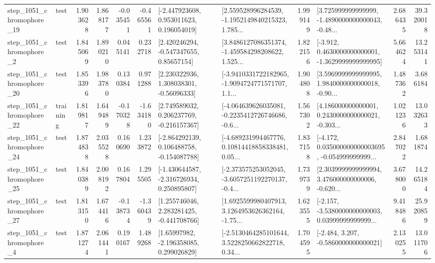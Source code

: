 \begin{tabular}{llrrrrllrlrr}
 step\_1051\_chromophore\_19 &      test &      1.903628 &    1.868177 &     -0.035451 & -0.465561 &    [-2.447923608, 0.953011623, 0.196054019] &  [2.559528996284539, -1.1952149840215323, 1.785... &       1.999149 &  [3.725999999999999, -1.4890000000000043, -0.48... &            2.686435 &         39.320018 \\
  step\_1051\_chromophore\_2 &      test &      1.845069 &    1.890210 &      0.045141 &  0.232718 &     [2.420246294, -0.547347655, 0.85657154] &  [3.8486127086351374, -1.459584298208622, 1.525... &       1.822156 &  [-3.912, 0.4630000000000001, -1.3629999999999995] &            5.664624 &         13.253141 \\
 step\_1051\_chromophore\_20 &      test &      1.853396 &    1.983780 &      0.130384 &  0.971288 &     [2.230322936, 1.308038301, -0.56096333] &  [-3.9410331722182965, -1.9094724771571707, 1.1... &       1.904808 &  [3.5969999999999995, 1.9840000000000018, -0.90... &            1.487362 &          3.686184 \\
 step\_1051\_chromophore\_22 &  training &      1.819817 &    1.649489 &     -0.170328 & -1.634180 &    [2.749589032, 0.206237769, -0.216157367] &  [-4.064639626035081, -0.2235412726746686, -0.6... &       1.567302 &  [4.186000000000001, 0.2430000000000021, -0.303... &            1.021236 &         13.032633 \\
 step\_1051\_chromophore\_24 &      test &      1.874838 &    2.035528 &      0.160690 &  1.233872 &   [-2.864292139, 0.106488758, -0.154087788] &  [-4.689231994467776, 0.10814418858338481, 0.05... &       1.837158 &  [-4.172, 0.035000000000003695, -0.054999999999... &            2.847022 &          1.681874 \\
 step\_1051\_chromophore\_25 &      test &      1.840389 &    2.008192 &      0.167804 &  1.295505 &   [-1.430644587, -2.316726934, 0.250895807] &  [-2.373575253052045, -3.6057251192270137, -0.4... &       1.739739 &  [2.3039999999999994, 3.476000000000006, -0.620... &            3.678000 &         14.265184 \\
 step\_1051\_chromophore\_27 &      test &      1.813150 &    1.674416 &     -0.138734 & -1.360439 &    [1.255746046, 2.283281425, -0.441708766] &  [1.6925599980407913, 3.1264953626362164, -1.75... &       1.623555 &  [-2.157, -3.5380000000000003, 0.03999999999999... &            9.418486 &         25.920859 \\
  step\_1051\_chromophore\_4 &      test &      1.871274 &    2.061441 &      0.190167 &  1.489268 &     [1.65997982, -2.196358085, 0.299026829] &  [-2.5130464285101644, 3.5228250662822718, 0.34... &       1.704595 &               [-2.484, 3.207, -0.5860000000000021] &            2.130255 &         13.011706 \\

\end{tabular}
